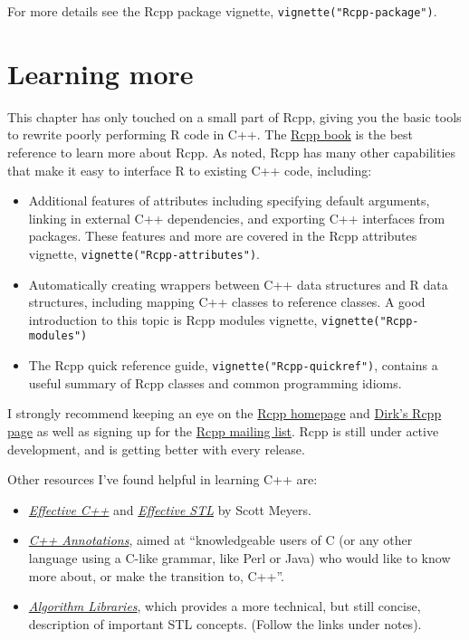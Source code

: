 For more details see the Rcpp package vignette,
\texttt{vignette("Rcpp-package")}.

\hypertarget{rcpp-more}{%
\section{Learning more}\label{rcpp-more}}

This chapter has only touched on a small part of Rcpp, giving you the
basic tools to rewrite poorly performing R code in C++. The
\href{http://www.rcpp.org/book}{Rcpp book} is the best reference to
learn more about Rcpp. As noted, Rcpp has many other capabilities that
make it easy to interface R to existing C++ code, including:

\begin{itemize}
\item
  Additional features of attributes including specifying default
  arguments, linking in external C++ dependencies, and exporting C++
  interfaces from packages. These features and more are covered in the
  Rcpp attributes vignette, \texttt{vignette("Rcpp-attributes")}.
\item
  Automatically creating wrappers between C++ data structures and R data
  structures, including mapping C++ classes to reference classes. A good
  introduction to this topic is Rcpp modules vignette,
  \texttt{vignette("Rcpp-modules")}
\item
  The Rcpp quick reference guide, \texttt{vignette("Rcpp-quickref")},
  contains a useful summary of Rcpp classes and common programming
  idioms.
\end{itemize}

I strongly recommend keeping an eye on the
\href{http://www.rcpp.org}{Rcpp homepage} and
\href{http://dirk.eddelbuettel.com/code/rcpp.html}{Dirk's Rcpp page} as
well as signing up for the
\href{http://lists.r-forge.r-project.org/cgi-bin/mailman/listinfo/rcpp-devel}{Rcpp
mailing list}. Rcpp is still under active development, and is getting
better with every release.

Other resources I've found helpful in learning C++ are:

\begin{itemize}
\item
  \href{http://amzn.com/0321334876?tag=devtools-20}{\emph{Effective
  C++}} and
  \href{http://amzn.com/0201749629?tag=devtools-20}{\emph{Effective
  STL}} by Scott Meyers.
\item
  \href{http://www.icce.rug.nl/documents/cplusplus/cplusplus.html}{\emph{C++
  Annotations}}, aimed at ``knowledgeable users of C (or any other
  language using a C-like grammar, like Perl or Java) who would like to
  know more about, or make the transition to, C++''.
\item
  \href{http://www.cs.helsinki.fi/u/tpkarkka/alglib/k06/}{\emph{Algorithm
  Libraries}}, which provides a more technical, but still concise,
  description of important STL concepts. (Follow the links under notes).
\end{itemize}

